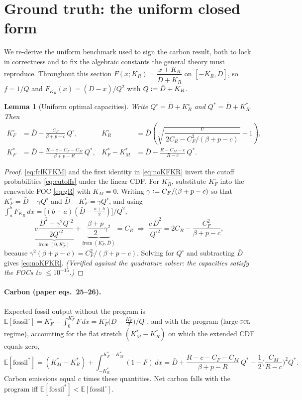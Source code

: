 \documentclass[11pt,reqno]{amsart}
\theoremstyle{plain}
\newtheorem{lemma}{Lemma}
\theoremstyle{definition}
\theoremstyle{remark}
\newcommand{\KR}{K_R}
\newcommand{\KM}{K_M}
\newcommand{\KRs}{K_R^{*}}
\newcommand{\KFs}{K_F^{*}}
\newcommand{\KMs}{K_M^{*}}
\newcommand{\KRo}{K_R^{\circ}}
\newcommand{\KFo}{K_F^{\circ}}
\newcommand{\Dbar}{\bar D}
\newcommand{\CM}{C_M}
\newcommand{\CF}{C_F}
\newcommand{\CR}{C_R}
\newcommand{\bp}{\beta+p}
\newcommand{\FKR}{F_{\!\KR}}
\newcommand{\E}{\mathbb{E}}
\newcommand{\eqdef}{\vcentcolon=}
\begin{document}
\section{Ground truth: the uniform closed form}\label{sec:uniform}

We re-derive the uniform benchmark used to sign the carbon result, both to lock
in correctness and to fix the algebraic constants the general theory must
reproduce. Throughout this section $F(x;\KR)=\dfrac{x+\KR}{\Dbar+\KR}$ on
$[-\KR,\Dbar]$, so $f=1/Q$ and $\FKR(x)=(\Dbar-x)/Q^2$ with $Q\eqdef\Dbar+\KR$.

\begin{lemma}[Uniform optimal capacities]\label{lem:uniform}
Write $Q^{\circ}=\Dbar+\KRo$ and $Q^{*}=\Dbar+\KRs$. Then
\begin{align}
  \KFo&=\Dbar-\frac{\CF}{\bp-c}\,Q^{\circ},
  &\KRo&=\Dbar\!\left(\sqrt{\dfrac{c}{\,2\CR-\CF^{2}/(\bp-c)\,}}-1\right),
  \label{eq:noKFKR}\\[4pt]
  \KFs&=\Dbar+\frac{R-c-\CF-\CM}{\bp-R}\,Q^{*},
  &\KFs-\KMs&=\Dbar-\frac{R-\CM-c}{R-c}\,Q^{*}.
  \label{eq:fclKFKM}
\end{align}
\end{lemma}

\begin{proof}
\eqref{eq:fclKFKM} and the first identity in \eqref{eq:noKFKR} invert the cutoff
probabilities \eqref{eq:cutoffs} under the linear CDF. For $\KRo$, substitute
$\KFo$ into the renewable FOC \eqref{eq:gR} with $\KM=0$. Writing
$\gamma\eqdef\CF/(\bp-c)$ so that $\KFo=\Dbar-\gamma Q^{\circ}$ and
$\Dbar-\KFo=\gamma Q^{\circ}$, and using
$\int_a^b\FKR\,dx=\big[(b-a)(\Dbar-\tfrac{a+b}{2})\big]/Q^2$,
\[
  \underbrace{c\,\frac{\Dbar^2-\gamma^2 Q^{\circ2}}{2Q^{\circ2}}}_{\text{from }(0,\KFo)}
  +\underbrace{\frac{\bp}{2}\gamma^2}_{\text{from }(\KFo,\Dbar)}=\CR
  \;\Longrightarrow\;
  \frac{c\,\Dbar^2}{Q^{\circ 2}}=2\CR-\frac{\CF^2}{\bp-c},
\]
because $\gamma^2(\bp-c)=\CF^2/(\bp-c)$. Solving for $Q^{\circ}$ and subtracting
$\Dbar$ gives \eqref{eq:noKFKR}. \emph{(Verified against the quadrature solver: the
capacities satisfy the FOCs to $\le10^{-15}$.)}
\end{proof}

\paragraph{Carbon (paper eqs.\ 25--26).}
Expected fossil output without the program is
$\E[\text{fossil}^{\circ}]=\KFo-\int_0^{\KFo}F\,dx
   =\KFo\big(\Dbar-\tfrac{\KFo}{2}\big)/Q^{\circ}$,
and with the program (large-\textsc{fcl} regime), accounting for the flat stretch
$(\KMs-\KRs)$ on which the extended CDF equals zero,
\begin{equation}\label{eq:fosfcl}
  \E[\text{fossil}^{*}]
  =(\KMs-\KRs)+\int_{-\KRs}^{\KFs-\KMs}\!(1-F)\,dx
  =\Dbar+\frac{R-c-\CF-\CM}{\bp-R}\,Q^{*}-\frac12\Big(\frac{\CM}{R-c}\Big)^{2}Q^{*}.
\end{equation}
Carbon emissions equal $c$ times these quantities. Net carbon falls with the
program iff $\E[\text{fossil}^{*}]<\E[\text{fossil}^{\circ}]$.
\end{document}
